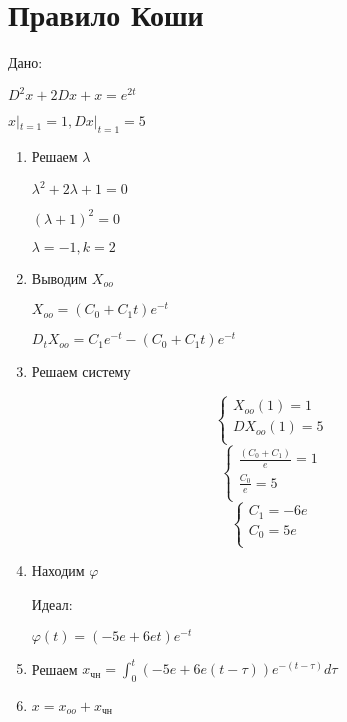 \documentclass{article}
\begin{document}
\section{Правило Коши}
Дано:

$D^2x+2Dx+x = e^{2t}$

$x|_{t=1}=1, Dx|_{t=1}=5$
\begin{enumerate}
    \item Решаем $\lambda$
    
    $\lambda^2+2\lambda+1=0$

    $(\lambda+1)^2=0$

    $\lambda=-1,k=2$
    \item Выводим $X_{oo}$
    
    $X_{oo}=(C_0+C_{1}t)e^{-t}$

    $D_tX_{oo}=C_1e^{-t}-(C_0+C_{1}t)e^{-t}$
    \item Решаем систему
    
\[
\left\{
\begin{aligned}
    X_{oo}(1)=1 \\
    DX_{oo}(1)=5 \\
\end{aligned}
\right.
\]  
\[
\left\{
\begin{aligned}
    \frac{(C_0+C_{1})}{e}=1 \\
    \frac{C_0}{e}=5 \\
\end{aligned}
\right.
\]  
\[
\left\{
\begin{aligned}
    C_1=-6e \\
    C_0=5e \\
\end{aligned}
\right.
\] 
    \item Находим $\varphi$
    
    Идеал: 

    $\varphi(t)=(-5e+6et)e^{-t}$

    \item Решаем $x_{\text{чн}}=\int_{0}^{t}(-5e+6e(t-\tau))e^{-(t-\tau)}d\tau$
    \item $x=x_{oo}+x_{\text{чн}}$
\end{enumerate}
\end{document}
